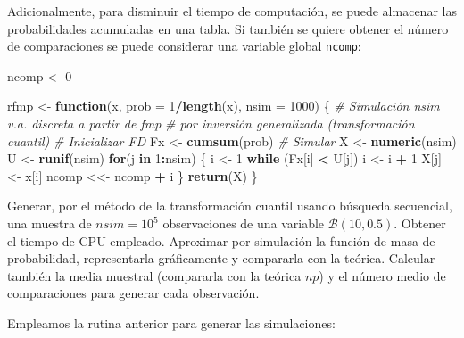 \documentclass[
]{book}
\newenvironment{Shaded}{\begin{snugshade}}{\end{snugshade}}
\newcommand{\CommentTok}[1]{\textcolor[rgb]{0.56,0.35,0.01}{\textit{#1}}}
\newcommand{\ControlFlowTok}[1]{\textcolor[rgb]{0.13,0.29,0.53}{\textbf{#1}}}
\newcommand{\DataTypeTok}[1]{\textcolor[rgb]{0.13,0.29,0.53}{#1}}
\newcommand{\DecValTok}[1]{\textcolor[rgb]{0.00,0.00,0.81}{#1}}
\newcommand{\KeywordTok}[1]{\textcolor[rgb]{0.13,0.29,0.53}{\textbf{#1}}}
\newcommand{\NormalTok}[1]{#1}
\newcommand{\OperatorTok}[1]{\textcolor[rgb]{0.81,0.36,0.00}{\textbf{#1}}}
\newcommand{\StringTok}[1]{\textcolor[rgb]{0.31,0.60,0.02}{#1}}
\theoremstyle{break}
\theoremstyle{definition}
\theoremstyle{definition}
\theoremstyle{definition}
\theoremstyle{remark}
\let\BeginKnitrBlock\begin \let\EndKnitrBlock\end
\begin{document}
Adicionalmente, para disminuir el tiempo de computación, se puede almacenar
las probabilidades acumuladas en una tabla.
Si también se quiere obtener el número de comparaciones
se puede considerar una variable global \texttt{ncomp}:

\begin{Shaded}
\begin{Highlighting}[]
\NormalTok{ncomp <-}\StringTok{ }\DecValTok{0}

\NormalTok{rfmp <-}\StringTok{ }\ControlFlowTok{function}\NormalTok{(x, }\DataTypeTok{prob =} \DecValTok{1}\OperatorTok{/}\KeywordTok{length}\NormalTok{(x), }\DataTypeTok{nsim =} \DecValTok{1000}\NormalTok{) \{}
  \CommentTok{# Simulación nsim v.a. discreta a partir de fmp}
  \CommentTok{# por inversión generalizada (transformación cuantil)}
  \CommentTok{# Inicializar FD}
\NormalTok{  Fx <-}\StringTok{ }\KeywordTok{cumsum}\NormalTok{(prob)}
  \CommentTok{# Simular}
\NormalTok{  X <-}\StringTok{ }\KeywordTok{numeric}\NormalTok{(nsim)}
\NormalTok{  U <-}\StringTok{ }\KeywordTok{runif}\NormalTok{(nsim)}
  \ControlFlowTok{for}\NormalTok{(j }\ControlFlowTok{in} \DecValTok{1}\OperatorTok{:}\NormalTok{nsim) \{}
\NormalTok{    i <-}\StringTok{ }\DecValTok{1}
    \ControlFlowTok{while}\NormalTok{ (Fx[i] }\OperatorTok{<}\StringTok{ }\NormalTok{U[j]) i <-}\StringTok{ }\NormalTok{i }\OperatorTok{+}\StringTok{ }\DecValTok{1}
\NormalTok{    X[j] <-}\StringTok{ }\NormalTok{x[i]}
\NormalTok{    ncomp <<-}\StringTok{ }\NormalTok{ncomp }\OperatorTok{+}\StringTok{ }\NormalTok{i}
\NormalTok{  \}}
  \KeywordTok{return}\NormalTok{(X)}
\NormalTok{\}}
\end{Highlighting}
\end{Shaded}

\BeginKnitrBlock{exercise}
\protect\hypertarget{exr:unnamed-chunk-10}{}{\label{exr:unnamed-chunk-10} }
\EndKnitrBlock{exercise}

Generar, por el método de la transformación cuantil usando
búsqueda secuencial, una muestra de \(nsim=10^{5}\) observaciones
de una variable \(\mathcal{B}(10,0.5)\).
Obtener el tiempo de CPU empleado. Aproximar
por simulación la función de masa de probabilidad, representarla
gráficamente y compararla con la teórica. Calcular también la
media muestral (compararla con la teórica \(np\)) y el número
medio de comparaciones para generar cada observación.

Empleamos la rutina anterior para generar las simulaciones:
\end{document}
